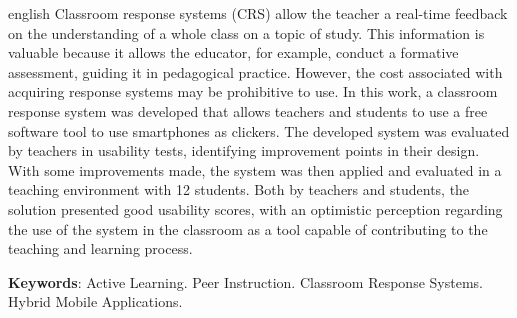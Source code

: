 \begin{resumo}[Abstract]
 \begin{otherlanguage*}{english}
   Classroom response systems (CRS) allow the teacher a real-time feedback on the understanding of a whole class on a topic of study. This information is valuable because it allows the educator, for example, conduct a formative assessment, guiding it in pedagogical practice.
However, the cost associated with acquiring response systems may be prohibitive to use. In this work, a classroom response system was developed that allows teachers and students to use a free software tool to use smartphones as clickers. The developed system was evaluated by teachers in usability tests, identifying improvement points in their design. With some improvements made, the system was then applied and evaluated in a teaching environment with 12 students. Both by teachers and students, the solution presented good usability scores, with an optimistic perception regarding the use of the system in the classroom as a tool capable of contributing to the teaching and learning process.



   \noindent
   \textbf{Keywords}: Active Learning. Peer Instruction. Classroom Response Systems. Hybrid Mobile Applications.
 \end{otherlanguage*}
\end{resumo}
